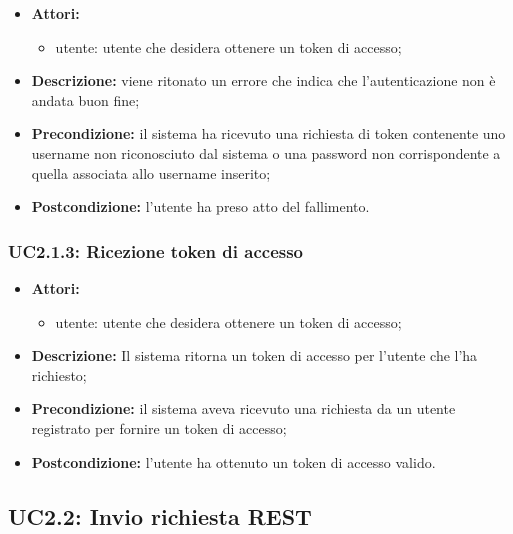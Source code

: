 \begin{itemize}
	\item \textbf{Attori:}
	\begin{itemize}
		\item utente: utente che desidera ottenere un token di accesso;
	\end{itemize}
	\item \textbf{Descrizione:} viene ritonato un errore che indica che l'autenticazione non è andata buon fine;
	\item \textbf{Precondizione:} il sistema ha ricevuto una richiesta di token contenente uno username non riconosciuto dal sistema o una password non corrispondente a quella associata allo username inserito;
	\item \textbf{Postcondizione:} l'utente ha preso atto del fallimento.
\end{itemize}

\subsubsection{UC2.1.3: Ricezione token di accesso}

\begin{itemize}
	\item \textbf{Attori:}
	\begin{itemize}
		\item utente: utente che desidera ottenere un token di accesso;
	\end{itemize}
	\item \textbf{Descrizione:} Il sistema ritorna un token di accesso per l'utente che l'ha richiesto;
	\item \textbf{Precondizione:} il sistema aveva ricevuto una richiesta da un utente registrato per fornire un token di accesso;
	\item \textbf{Postcondizione:} l'utente ha ottenuto un token di accesso valido.
\end{itemize}


\pagebreak

\subsection{UC2.2: Invio richiesta REST}


